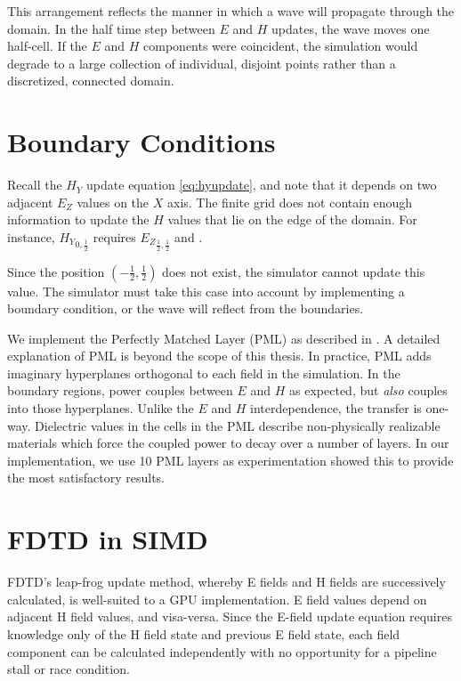 This arrangement reflects the manner in which a wave will propagate through the domain. In the half time step between $E$ and $H$ updates, the wave moves one half-cell. If the $E$ and $H$ components were coincident, the simulation would degrade to a large collection of individual, disjoint points rather than a discretized, connected domain.


\section{Boundary Conditions}

Recall the $H_Y$ update equation \autoref{eq:hyupdate}, and note that it depends on two adjacent $E_Z$ values on the $X$ axis. The finite grid does not contain enough information to update the $H$ values that lie on the edge of the domain. For instance, ${H_Y}_{0,\frac{1}{2}}$ requires ${E_Z}_{\frac{1}{2},\frac{1}{2}}$ and .

Since the position $(-\frac{1}{2},\frac{1}{2})$ does not exist, the simulator cannot update this value. The simulator must take this case into account by implementing a boundary condition, or the wave will reflect from the boundaries. 

We implement the Perfectly Matched Layer (PML) as described in \cite{BERENGER1994185}. A detailed explanation of PML is beyond the scope of this thesis. In practice, PML adds imaginary hyperplanes orthogonal to each field in the simulation. In the boundary regions, power couples between $E$ and $H$ as expected, but \emph{also} couples into those hyperplanes. Unlike the $E$ and $H$ interdependence, the transfer is one-way. Dielectric values in the cells in the PML describe non-physically realizable materials which force the coupled power to decay over a number of layers. In our implementation, we use 10 PML layers as experimentation showed this to provide the most satisfactory results.



\section{FDTD in SIMD}

FDTD's leap-frog update method, whereby E fields and H fields are successively calculated, is well-suited to a GPU implementation. E field values depend on adjacent H field values, and visa-versa. Since the E-field update equation requires knowledge only of the H field state and previous E field state, each field component can be calculated independently with no opportunity for a pipeline stall or race condition. 

